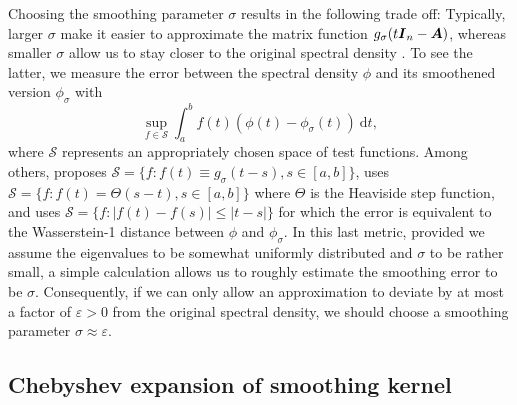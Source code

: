 Choosing the smoothing parameter $\sigma$ results in the following trade off: Typically, larger $\sigma$ make it easier to approximate the matrix function $g_{\sigma}(t\boldsymbol{I}_n - \boldsymbol{A})$, whereas smaller $\sigma$ allow us to stay closer to the original spectral density . To see the latter, we measure the error between the spectral density $\phi$ and its smoothened version $\phi_{\sigma}$ with
\begin{equation}
    \sup_{f \in \mathcal{S}} \int_{a}^{b} f(t) (\phi(t) - \phi_{\sigma}(t))~\mathrm{d}t,
    \label{equ:error-metric}
\end{equation}
where $\mathcal{S}$ represents an appropriately chosen space of test functions. Among others, \cite{lin-2016-approximating-spectral} proposes $\mathcal{S} = \{ f: f(t) \equiv g_{\sigma}(t - s), s \in [a, b]\}$, \cite{chen-2021-analysis-stochastic} uses $\mathcal{S} = \{f : f(t) = \Theta(s - t), s \in [a, b] \}$ where $\Theta$ is the Heaviside step function, and \cite{braverman-2022-sublinear-time} uses $\mathcal{S} = \{f : |f(t) - f(s)| \leq |t - s| \}$ for which the error  is equivalent to the Wasserstein-1 distance between $\phi$ and $\phi_{\sigma}$. In this last metric, provided we assume the eigenvalues to be somewhat uniformly distributed and $\sigma$ to be rather small, a simple calculation allows us to roughly estimate the smoothing error  to be $\sigma$. Consequently, if we can only allow an approximation to deviate by at most a factor of $\varepsilon > 0$ from the original spectral density, we should choose a smoothing parameter $\sigma \approx \varepsilon$.

\subsection{Chebyshev expansion of smoothing kernel}
\label{subsec:chebyshev-expansion}

